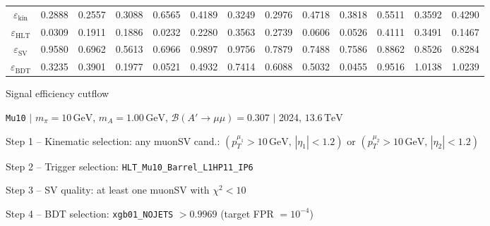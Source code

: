 \documentclass[10pt,a4paper]{article}
\begin{document}
\begin{landscape}
{\begin{tabular}{c|cccc|cccc|cccc}
\midrule
$\varepsilon_{\mathrm{kin}}$ & 0.2888 & 0.2557 & 0.3088 & 0.6565 & 0.4189 & 0.3249 & 0.2976 & 0.4718 & 0.3818 & 0.5511 & 0.3592 & 0.4290\\
$\varepsilon_{\mathrm{HLT}}$ & 0.0309 & 0.1911 & 0.1886 & 0.0232 & 0.2280 & 0.3563 & 0.2739 & 0.0606 & 0.0526 & 0.4111 & 0.3491 & 0.1467\\
$\varepsilon_{\mathrm{SV}}$ & 0.9580 & 0.6962 & 0.5613 & 0.6966 & 0.9897 & 0.9756 & 0.7879 & 0.7488 & 0.7586 & 0.8862 & 0.8526 & 0.8284\\
$\varepsilon_{\mathrm{BDT}}$ & 0.3235 & 0.3901 & 0.1977 & 0.0521 & 0.4932 & 0.7414 & 0.6088 & 0.5032 & 0.0455 & 0.9516 & 1.0138 & 1.0239\\
\bottomrule
\end{tabular}}

\end{landscape}
\clearpage

{\large Signal efficiency cutflow

 \texttt{Mu10} $|$ $m_{\pi}=10\,\mathrm{GeV}$, $m_{A}=1.00\,\mathrm{GeV}$, $\mathcal{B}(A'\!\to\!\mu\mu)=0.307$ $|$ 2024, $13.6\,\mathrm{TeV}$}

\vspace{0.8em}

Step 1 -- Kinematic selection: any muonSV cand.: $(p_T^{\mu_1}{>}10\,\mathrm{GeV},\,|\eta_1|{<}1.2)$ or $(p_T^{\mu_2}{>}10\,\mathrm{GeV},\,|\eta_2|{<}1.2)$

Step 2 -- Trigger selection: \texttt{HLT\_Mu10\_Barrel\_L1HP11\_IP6}

Step 3 -- SV quality: at least one muonSV with $\chi^2<10$

Step 4 -- BDT selection: \texttt{xgb01\_NOJETS} $>0.9969$ (target FPR $=10^{-4}$)

\vspace{0.8em}
\end{document}
